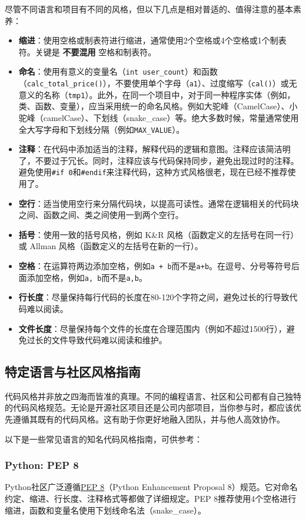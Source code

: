 \documentclass[../main.tex]{subfiles}
\begin{document}
尽管不同语言和项目有不同的风格，但以下几点是相对普适的、值得注意的基本素养：
\begin{itemize}
  \item \textbf{缩进}：使用空格或制表符进行缩进，通常使用2个空格或4个空格或1个制表符。关键是 \textbf{不要混用} 空格和制表符。
  \item \textbf{命名}：使用有意义的变量名（\texttt{int user\_count}）和函数（\texttt{calc\_total\_price()}），不要使用单个字母（\texttt{a1}）、过度缩写（\texttt{cal()}）或无意义的名称（\texttt{tmp1}）。此外，在同一个项目中，对于同一种程序实体（例如，类、函数、变量），应当采用统一的命名风格。例如大驼峰（CamelCase）、小驼峰（camelCase）、下划线（snake\_case）等。绝大多数时候，常量通常使用全大写字母和下划线分隔（例如\texttt{MAX\_VALUE}）。
  \item \textbf{注释}：在代码中添加适当的注释，解释代码的逻辑和意图。注释应该简洁明了，不要过于冗长。同时，注释应该与代码保持同步，避免出现过时的注释。避免使用\texttt{\#if 0}和\texttt{\#endif}来注释代码，这种方式风格很老，现在已经不推荐使用了。
  \item \textbf{空行}：适当使用空行来分隔代码块，以提高可读性。通常在逻辑相关的代码块之间、函数之间、类之间使用一到两个空行。
  \item \textbf{括号}：使用一致的括号风格，例如 K\&R 风格（函数定义的左括号在同一行）或 Allman 风格（函数定义的左括号在新的一行）。
  \item \textbf{空格}：在运算符两边添加空格，例如\texttt{a + b}而不是\texttt{a+b}。在逗号、分号等符号后面添加空格，例如\texttt{a, b}而不是\texttt{a,b}。
  \item \textbf{行长度}：尽量保持每行代码的长度在80-120个字符之间，避免过长的行导致代码难以阅读。
  \item \textbf{文件长度}：尽量保持每个文件的长度在合理范围内（例如不超过1500行），避免过长的文件导致代码难以阅读和维护。
\end{itemize}

\subsection{特定语言与社区风格指南}

代码风格并非放之四海而皆准的真理。不同的编程语言、社区和公司都有自己独特的代码风格规范。无论是开源社区项目还是公司内部项目，当你参与时，都应该优先遵循其既有的代码风格。这有助于你更好地融入团队，并与他人高效协作。

以下是一些常见语言的知名代码风格指南，可供参考：

\subsubsection{Python: PEP 8}
Python社区广泛遵循\href{https://www.python.org/dev/peps/pep-0008/}{PEP 8}（Python Enhancement Proposal 8）规范。它对命名约定、缩进、行长度、注释格式等都做了详细规定。PEP 8推荐使用4个空格进行缩进，函数和变量名使用下划线命名法（snake\_case）。
\end{document}
